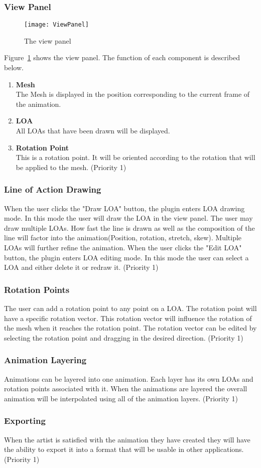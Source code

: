 \subsubsection{View Panel}
\begin{figure}[H]
\centering
\texttt{[image: ViewPanel]}
\caption{The view panel}
\label{fig:viewPanel}
\end{figure}
Figure~\ref{fig:viewPanel} shows the view panel.  The function of each component is described below.
\begin{enumerate}
	\item \textbf{Mesh} \hfill \\
		The Mesh is displayed in the position corresponding to the current frame of the animation.
	\item \textbf{LOA} \hfill \\
		All LOAs that have been drawn will be displayed.
	\item \textbf{Rotation Point} \hfill \\
		This is a rotation point.  It will be oriented according to the rotation that will be applied to the mesh.
(Priority 1)
\end{enumerate}
\subsubsection{Line of Action Drawing}
	When the user clicks the "Draw LOA" button, the plugin enters LOA drawing mode.  In this mode the user will draw the LOA in the view panel.  The user may draw multiple LOAs.  How fast the line is drawn as well as the composition of the line will factor into the animation(Position, rotation, stretch, skew).  Multiple LOAs will further refine the animation.
	When the user clicks the "Edit LOA" button, the plugin enters LOA editing mode.  In this mode the user can select a LOA and either delete it or redraw it. (Priority 1)
\subsubsection{Rotation Points}
	The user can add a rotation point to any point on a LOA.  The rotation point will have a specific rotation vector.  This rotation vector will influence the rotation of the mesh when it reaches the rotation point.  The rotation vector can be edited by selecting the rotation point and dragging in the desired direction. (Priority 1)
\subsubsection{Animation Layering}
	Animations can be layered into one animation.  Each layer has its own LOAs and rotation points associated with it.  When the animations are layered the overall animation will be interpolated using all of the animation layers. (Priority 1)

\subsubsection{Exporting}
	When the artist is satisfied with the animation they have created they will have the ability to export it into a format that will be usable in other applications. (Priority 1)

